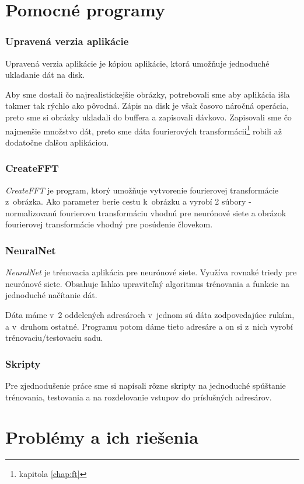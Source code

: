 \section{Pomocné programy}

\subsubsection{Upravená verzia aplikácie}
\label{chap:saveimageapp}
Upravená verzia aplikácie je kópiou aplikácie, ktorá umožňuje jednoduché ukladanie dát na disk.

Aby sme dostali čo najrealistickejšie obrázky, potrebovali sme aby aplikácia išla takmer tak rýchlo ako pôvodná. Zápis na disk je však časovo náročná operácia, preto sme si obrázky ukladali do buffera a zapisovali dávkovo. Zapisovali sme čo najmenšie množstvo dát, preto sme dáta fourierových transformácií\footnote{kapitola \ref{chap:ft} } robili až dodatočne ďalšou aplikáciou.

\subsubsection{CreateFFT}

\textit{CreateFFT} je program, ktorý umožňuje vytvorenie fourierovej transformácie z~obrázka. Ako parameter berie cestu k~obrázku a vyrobí 2 súbory - normalizovanú fourierovu transformáciu vhodnú pre neurónové siete a obrázok fourierovej transformácie vhodný pre posúdenie človekom.

\todo

\subsubsection{NeuralNet}
\textit{NeuralNet} je trénovacia aplikácia pre neurónové siete. Využíva rovnaké triedy pre neurónové siete. Obsahuje ľahko upraviteľný algoritmus trénovania a funkcie na jednoduché načítanie dát. 

Dáta máme v~2 oddelených adresároch v~jednom sú dáta zodpovedajúce rukám, a v~druhom ostatné. Programu potom dáme tieto adresáre a on si z~nich vyrobí trénovaciu/testovaciu sadu.

\todo

\subsubsection{Skripty}
Pre zjednodušenie práce sme si napísali rôzne skripty na jednoduché spúštanie trénovania, testovania a na rozdelovanie vstupov do príslušných adresárov.
\todo

\section{Problémy a ich riešenia}
\todo